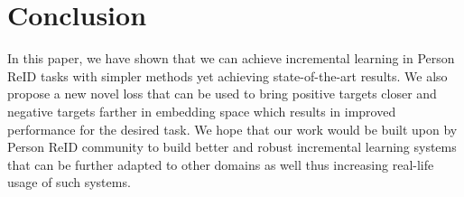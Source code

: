 \documentclass[10pt,twocolumn,letterpaper]{article}
\begin{document}
\section{Conclusion}
In this paper, we have shown that we can achieve incremental learning in Person ReID tasks with simpler methods yet achieving state-of-the-art results. We also propose a new novel loss that can be used to bring positive targets closer and negative targets farther in embedding space which results in improved performance for the desired task. We hope that our work would be built upon by Person ReID community to build better and robust incremental learning systems that can be further adapted to other domains as well thus increasing real-life usage of such systems. 

{\small


}
\end{document}
